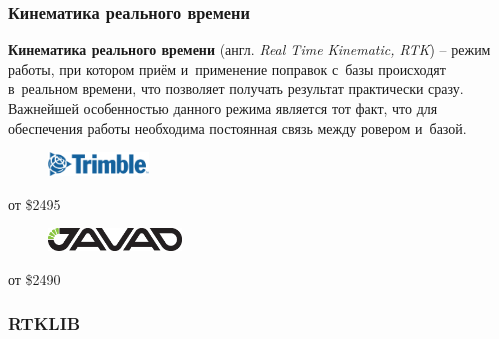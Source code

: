 \documentclass[xetex,t]{beamer}
\begin{document}
%
%
\begin{frame}
  \frametitle{Кинематика реального времени}

  \begin{center}
    \textbf{Кинематика реального времени} (англ. \emph{Real Time Kinematic, RTK}) -- режим работы, при котором приём и~применение поправок с~базы происходят в~реальном времени, что позволяет получать результат практически сразу. Важнейшей особенностью данного режима является тот факт, что для обеспечения работы необходима постоянная связь между ровером и~базой.
  \end{center}

  \vskip 0.25cm

  \begin{minipage}{\textwidth}
    \centering
    \begin{minipage}[t]{.3\textwidth}
      \centering
      \begin{figure}[h]
        \centering
        \includegraphics[height=18pt]{../img/trimble}
      \end{figure}
      от \$2495

      {
        \scriptsize
        \color{gray}{Trimble R1 GNSS Receiver}
      }
    \end{minipage}
    \hspace{1em}
    \begin{minipage}[t]{.3\textwidth}
      \centering
      \begin{figure}[h]
        \centering
        \includegraphics[height=17pt]{../img/javad}
      \end{figure}
      от \$2490

      {
        \scriptsize
        \color{gray}{TRIUMPH-2}
      }
    \end{minipage}
  \end{minipage}
\end{frame}


%
%
\begin{frame}
  \frametitle{RTKLIB}
\end{frame}


%
%
\begin{frame}[c]
\begin{center}
  \Huge\bfseries
  \color{ifmoblue}{Спасибо за внимание}
\end{center}
\end{frame}
\end{document}
